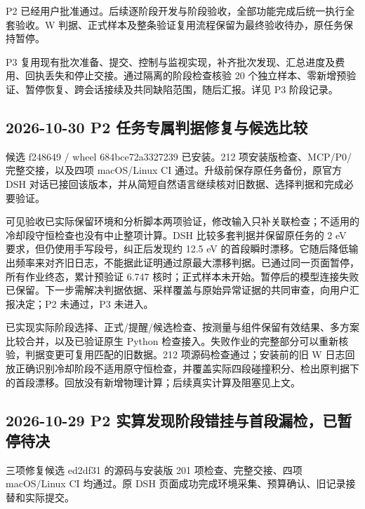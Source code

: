 \documentclass[11pt,a4paper]{ctexart}
\begin{document}
P2 已经用户批准通过。后续逐阶段开发与阶段验收，全部功能完成后统一执行全套验收。W 判据、正式样本及整条验证复用流程保留为最终验收待办，原任务保持暂停。



P3 复用现有批次准备、提交、控制与监视实现，补齐批次发现、汇总进度及费用、回执丢失和停止交接。通过隔离的阶段检查核验 20 个独立样本、零新增预验证、暂停恢复、跨会话接续及共同缺陷范围，随后汇报。详见 P3 阶段记录。



\subsection{2026-10-30 P2 任务专属判据修复与候选比较}


候选 f248649 /\allowbreak{} wheel 684bce72a3327239 已安装。212 项安装版检查、MCP/\allowbreak{}P0/\allowbreak{}完整交接，以及四项 macOS/\allowbreak{}Linux CI 通过。升级前保存原任务备份，原官方 DSH 对话已接回该版本，并从简短自然语言继续核对旧数据、选择判据和完成必要验证。



可见验收已实际保留环境和分析脚本两项验证，修改输入只补关联检查；不适用的冷却段守恒检查也没有中止整项计算。DSH 比较多套判据并保留原任务的 2 eV 要求，但仍使用手写段号，纠正后发现约 12.5 eV 的首段瞬时漂移。它随后降低输出频率来对齐旧日志，不能据此证明通过原最大漂移判据。已通过同一页面暂停，所有作业终态，累计预验证 6.747 核时；正式样本未开始。暂停后的模型连接失败已保留。下一步需解决判据依据、采样覆盖与原始异常证据的共同审查，向用户汇报决定；P2 未通过，P3 未进入。



已实现实际阶段选择、正式/\allowbreak{}提醒/\allowbreak{}候选检查、按测量与组件保留有效结果、多方案比较合并，以及已验证原生 Python 检查接入。失败作业的完整部分可以重新核验，判据变更可复用匹配的旧数据。212 项源码检查通过；安装前的旧 W 日志回放正确识别冷却阶段不适用原守恒检查，并覆盖实际四段碰撞积分、检出原判据下的首段漂移。回放没有新增物理计算；后续真实计算及阻塞见上文。



\subsection{2026-10-29 P2 实算发现阶段错挂与首段漏检，已暂停待决}


三项修复候选 ed2df31 的源码与安装版 201 项检查、完整交接、四项 macOS/\allowbreak{}Linux CI 均通过。原 DSH 页面成功完成环境采集、预算确认、旧记录接替和实际提交。
\end{document}
